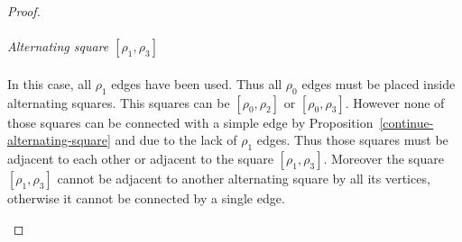 \begin{proof}
  \paragraph{}
  \textit{Alternating square $[\rho_1, \rho_3]$}

  \paragraph{}
  In this case, all $\rho_1$ edges have been used. Thus all $\rho_0$ edges must be placed inside alternating squares. This squares can be $[\rho_0, \rho_2]$ or $[\rho_0, \rho_3]$. However none of those squares can be connected with a simple edge by Proposition~\ref{continue-alternating-square} and due to the lack of $\rho_1$ edges. Thus those squares must be adjacent to each other or adjacent to the square $[\rho_1, \rho_3]$. Moreover the square $[\rho_1, \rho_3]$ cannot be adjacent to another alternating square by all its vertices, otherwise it cannot be connected by a single edge.

  \begin{figure}[H]
    \begin{center}
\end{center}
\end{figure}
\end{proof}
